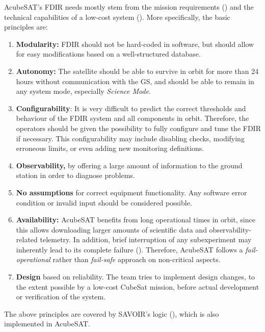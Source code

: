 \documentclass[a4paper,nobib]{tufte-book}
\begin{document}
AcubeSAT's \acs{FDIR} needs mostly stem from the mission requirements () and the technical capabilities of a low-cost system (). More specifically, the basic principles are:
\begin{enumerate}
	\item \textbf{Modularity:} \acs{FDIR} should not be hard-coded in software, but should allow for easy modifications based on a well-structured database.
		\item \textbf{Autonomy:} The satellite should be able to survive in orbit for more than \SI{24}{} hours without communication with the \acs{GS}, and should be able to remain in any system mode, especially \emph{Science Mode}.
		\item \textbf{Configurability}: It is very difficult to predict the correct thresholds and behaviour of the \acs{FDIR} system and all components in orbit. Therefore, the operators should be given the possibility to fully configure and tune the \acs{FDIR} if necessary. This configurability may include disabling checks, modifying erroneous limits, or even adding new monitoring definitions.
		\item \textbf{Observability,} by offering a large amount of information to the ground station in order to diagnose problems.
		\item \textbf{No assumptions} for correct equipment functionality. Any software error condition or invalid input should be considered possible.
		\item \textbf{Availability:} AcubeSAT benefits from long operational times in orbit, since this allows downloading larger amounts of scientific data and observability-related telemetry. In addition, brief interruption of any subexperiment may inherently lead to its complete failure (). Therefore, AcubeSAT follows a \emph{fail-operational} rather than \emph{fail-safe} approach on non-critical aspects.
		\item \textbf{Design} based on reliability. The team tries to implement design changes, to the extent possible by a low-cost CubeSat mission, before actual development or verification of the system.
	\end{enumerate}
	
The above principles are covered by \acs{SAVOIR}'s logic (), which is also implemented in AcubeSAT.
\end{document}
